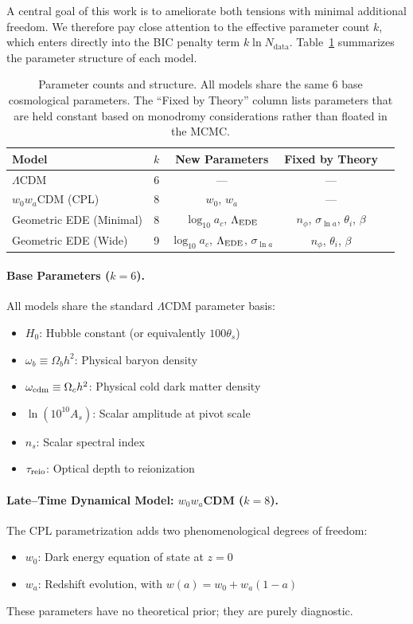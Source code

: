 \documentclass[a4paper,11pt]{article}
\begin{document}
A central goal of this work is to ameliorate both tensions with minimal additional freedom. We therefore pay close attention to the effective parameter count $k$, which enters directly into the BIC penalty term $k \ln N_{\mathrm{data}}$. Table~\ref{tab:param_counts} summarizes the parameter structure of each model.

\begin{table}[h]
\centering
\caption{Parameter counts and structure. All models share the same 6 base cosmological parameters. The ``Fixed by Theory'' column lists parameters that are held constant based on monodromy considerations rather than floated in the MCMC.}
\label{tab:param_counts}
\begin{tabular}{lcccc}
\toprule
Model & $k$ & New Parameters & Fixed by Theory \\
\midrule
$\Lambda$CDM & 6 & --- & --- \\
$w_0w_a$CDM (CPL) & 8 & $w_0$, $w_a$ & --- \\
Geometric EDE (Minimal) & 8 & $\log_{10}a_c$, $\Lambda_{\rm EDE}$ & $n_\phi$, $\sigma_{\ln a}$, $\theta_i$, $\beta$ \\
Geometric EDE (Wide) & 9 & $\log_{10}a_c$, $\Lambda_{\rm EDE}$, $\sigma_{\ln a}$ & $n_\phi$, $\theta_i$, $\beta$ \\
\bottomrule
\end{tabular}
\end{table}

\paragraph{Base Parameters ($k = 6$).}
All models share the standard $\Lambda$CDM parameter basis:
\begin{itemize}
    \item $H_0$: Hubble constant (or equivalently $100\theta_s$)
    \item $\omega_b \equiv \Omega_b h^2$: Physical baryon density
    \item $\omega_{\rm cdm} \equiv \Omega_c h^2$: Physical cold dark matter density
    \item $\ln(10^{10}A_s)$: Scalar amplitude at pivot scale
    \item $n_s$: Scalar spectral index
    \item $\tau_{\rm reio}$: Optical depth to reionization
\end{itemize}

\paragraph{Late--Time Dynamical Model: $w_0 w_a$CDM ($k = 8$).}
The CPL parametrization adds two phenomenological degrees of freedom:
\begin{itemize}
    \item $w_0$: Dark energy equation of state at $z = 0$
    \item $w_a$: Redshift evolution, with $w(a) = w_0 + w_a(1 - a)$
\end{itemize}
These parameters have no theoretical prior; they are purely diagnostic.
\end{document}
